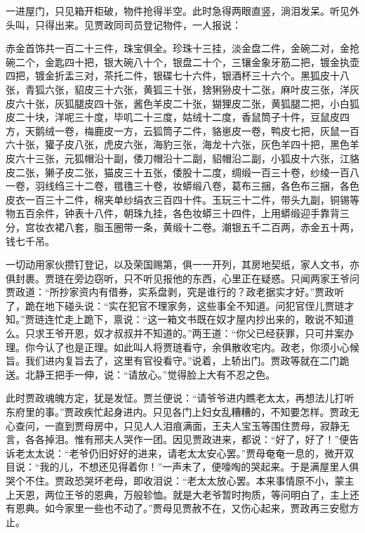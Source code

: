 \begin{parag}
    一进屋门，只见箱开柜破，物件抢得半空。此时急得两眼直竖，淌泪发呆。听见外头叫，只得出来。见贾政同司员登记物件，一人报说：
\end{parag}


\begin{qute2sp}
    赤金首饰共一百二十三件，珠宝俱全。珍珠十三挂，淡金盘二件，金碗二对，金抢碗二个，金匙四十把，银大碗八十个，银盘二十个，三镶金象牙筋二把，镀金执壶四把，镀金折盂三对，茶托二件，银碟七十六件，银酒杯三十六个。黑狐皮十八张，青狐六张，貂皮三十六张，黄狐三十张，猞猁狲皮十二张，麻叶皮三张，洋灰皮六十张，灰狐腿皮四十张，酱色羊皮二十张，猢狸皮二张，黄狐腿二把，小白狐皮二十块，洋呢三十度，毕叽二十三度，姑绒十二度，香鼠筒子十件，豆鼠皮四方，天鹅绒一卷，梅鹿皮一方，云狐筒子二件，貉崽皮一卷，鸭皮七把，灰鼠一百六十张，獾子皮八张，虎皮六张，海豹三张，海龙十六张，灰色羊四十把，黑色羊皮六十三张，元狐帽沿十副，倭刀帽沿十二副，貂帽沿二副，小狐皮十六张，江貉皮二张，獭子皮二张，猫皮三十五张，倭股十二度，绸缎一百三十卷，纱绫一百八一卷，羽线绉三十二卷，氆氇三十卷，妆蟒缎八卷，葛布三捆，各色布三捆，各色皮衣一百三十二件，棉夹单纱绢衣三百四十件。玉玩三十二件，带头九副，铜锡等物五百余件，钟表十八件，朝珠九挂，各色妆蟒三十四件，上用蟒缎迎手靠背三分，宫妆衣裙八套，脂玉圈带一条，黄缎十二卷。潮银五千二百两，赤金五十两，钱七千吊。
\end{qute2sp}


\begin{parag}
    一切动用家伙攒钉登记，以及荣国赐第，俱一一开列，其房地契纸，家人文书，亦俱封裹。贾琏在旁边窃听，只不听见报他的东西，心里正在疑惑。只闻两家王爷问贾政道：“所抄家资内有借券，实系盘剥，究是谁行的？政老据实才好。”贾政听了，跪在地下碰头说：“实在犯官不理家务，这些事全不知道。问犯官侄儿贾琏才知。”贾琏连忙走上跪下，禀说：“这一箱文书既在奴才屋内抄出来的，敢说不知道么。只求王爷开恩，奴才叔叔并不知道的。”两王道：“你父已经获罪，只可并案办理。你今认了也是正理。如此叫人将贾琏看守，余俱散收宅内。政老，你须小心候旨。我们进内复旨去了，这里有官役看守。”说着，上轿出门。贾政等就在二门跪送。北静王把手一伸，说：“请放心。”觉得脸上大有不忍之色。
\end{parag}


\begin{parag}
    此时贾政魂魄方定，犹是发怔。贾兰便说：“请爷爷进内瞧老太太，再想法儿打听东府里的事。”贾政疾忙起身进内。只见各门上妇女乱糟糟的，不知要怎样。贾政无心查问，一直到贾母房中，只见人人泪痕满面，王夫人宝玉等围住贾母，寂静无言，各各掉泪。惟有邢夫人哭作一团。因见贾政进来，都说：“好了，好了！”便告诉老太太说：“老爷仍旧好好的进来，请老太太安心罢。”贾母奄奄一息的，微开双目说：“我的儿，不想还见得着你！”一声未了，便嚎啕的哭起来。于是满屋里人俱哭个不住。贾政恐哭坏老母，即收泪说：“老太太放心罢。本来事情原不小，蒙主上天恩，两位王爷的恩典，万般轸恤。就是大老爷暂时拘质，等问明白了，主上还有恩典。如今家里一些也不动了。”贾母见贾赦不在，又伤心起来，贾政再三安慰方止。
\end{parag}


